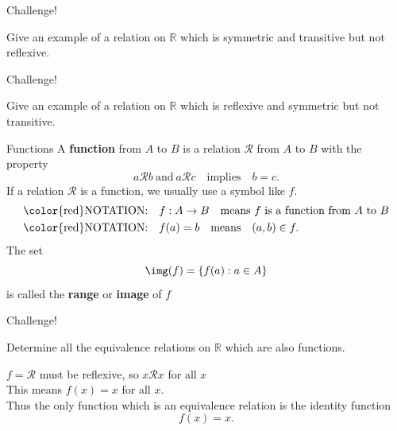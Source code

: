 \documentclass{beamer}
\begin{document}
\begin{frame}{Challenge!}
\begin{prob}
Give an example of a relation on $\mathbb{R}$ which is symmetric and transitive but not reflexive.
\end{prob}
\end{frame}

\begin{frame}{Challenge!}
\begin{prob}
Give an example of a relation on $\mathbb{R}$ which is reflexive and symmetric but not transitive.
\end{prob}
\end{frame}

\begin{frame}{Functions}
A \textbf{function} from $A$ to $B$ is a relation $\mathcal R$ from $A$ to $B$ with the property
\pause
$$a\mathcal Rb\ \text{and}\ a\mathcal Rc\quad\text{implies}\quad b=c.$$
\pause
If a relation $\mathcal R$ is a function, we usually use a symbol like $f$.\\
\pause
\begin{align*}
\text{\color{red}NOTATION:}&\quad f: A\rightarrow B\quad\text{means $f$ is a function from $A$ to $B$}\\
\text{\color{red}NOTATION:}&\quad f(a) = b\quad\text{means}\quad (a,b)\in f.
\end{align*}
\pause
The set $$\img(f) = \{f(a): a\in A\}$$ is called the \textbf{range} or \textbf{image} of $f$
\end{frame}

\begin{frame}{Challenge!}
\begin{prob}
Determine all the equivalence relations on $\mathbb{R}$ which are also functions.
\end{prob}
\pause
\begin{soln}
$f=\mathcal R$ must be reflexive, so $x\mathcal Rx$ for all $x$\\
\pause
This means $f(x) = x$ for all $x$.\\
\pause
Thus the only function which is an equivalence relation is the identity function
$$f(x) = x.$$
\end{soln}
\end{frame}
\end{document}
